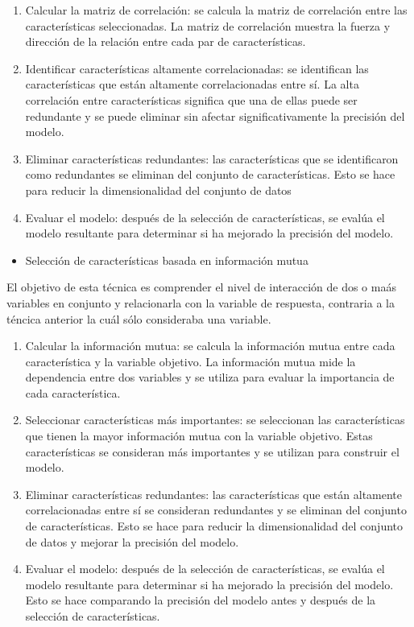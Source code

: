 \documentclass[twocolumn]{bmcart}%
\begin{document}
\begin{enumerate}
    \item Calcular la matriz de correlación: se calcula la matriz de correlación entre las características seleccionadas. La matriz de correlación muestra la fuerza y dirección de la relación entre cada par de características.
    \item Identificar características altamente correlacionadas: se identifican las características que están altamente correlacionadas entre sí. La alta correlación entre características significa que una de ellas puede ser redundante y se puede eliminar sin afectar significativamente la precisión del modelo.
    \item Eliminar características redundantes: las características que se identificaron como redundantes se eliminan del conjunto de características. Esto se hace para reducir la dimensionalidad del conjunto de datos 
    \item Evaluar el modelo: después de la selección de características, se evalúa el modelo resultante para determinar si ha mejorado la precisión del modelo. \cite{Naik}

\end{enumerate}

\begin{itemize}
    \item Selección de características basada en información mutua
\end{itemize}
El objetivo de esta técnica es comprender el nivel de interacción de dos o maás variables en conjunto y relacionarla con la variable de respuesta, contraria a la téncica anterior la cuál sólo consideraba una variable. 

\begin{enumerate}
    \item Calcular la información mutua: se calcula la información mutua entre cada característica y la variable objetivo. La información mutua mide la dependencia entre dos variables y se utiliza para evaluar la importancia de cada característica.
    \item Seleccionar características más importantes: se seleccionan las características que tienen la mayor información mutua con la variable objetivo. Estas características se consideran más importantes y se utilizan para construir el modelo.
    \item Eliminar características redundantes: las características que están altamente correlacionadas entre sí se consideran redundantes y se eliminan del conjunto de características. Esto se hace para reducir la dimensionalidad del conjunto de datos y mejorar la precisión del modelo.
    \item Evaluar el modelo: después de la selección de características, se evalúa el modelo resultante para determinar si ha mejorado la precisión del modelo. Esto se hace comparando la precisión del modelo antes y después de la selección de características. \cite{SQ1}

\end{enumerate}
\end{document}
